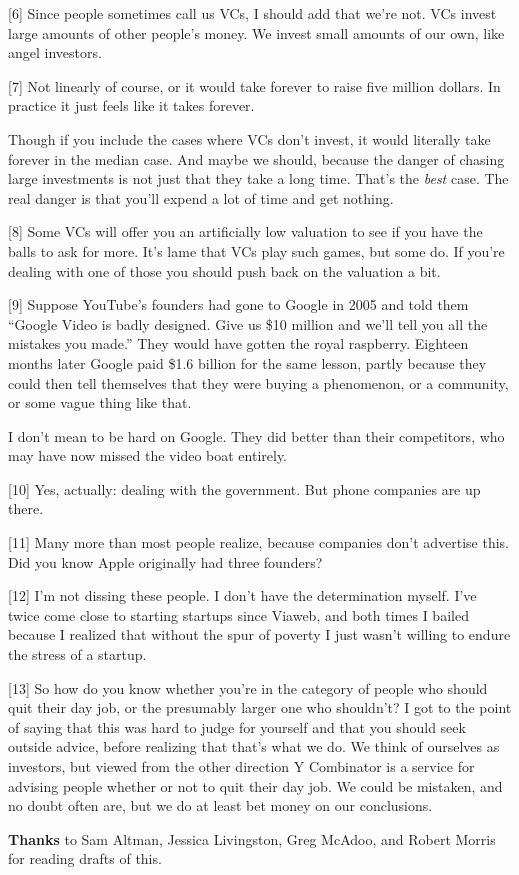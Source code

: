 {[}6{]} Since people sometimes call us VCs, I should add that we're not.
VCs invest large amounts of other people's money. We invest small
amounts of our own, like angel investors.

{[}7{]} Not linearly of course, or it would take forever to raise five
million dollars. In practice it just feels like it takes forever.

Though if you include the cases where VCs don't invest, it would
literally take forever in the median case. And maybe we should, because
the danger of chasing large investments is not just that they take a
long time. That's the \emph{best} case. The real danger is that you'll
expend a lot of time and get nothing.

{[}8{]} Some VCs will offer you an artificially low valuation to see if
you have the balls to ask for more. It's lame that VCs play such games,
but some do. If you're dealing with one of those you should push back on
the valuation a bit.

{[}9{]} Suppose YouTube's founders had gone to Google in 2005 and told
them ``Google Video is badly designed. Give us \$10 million and we'll
tell you all the mistakes you made.'' They would have gotten the royal
raspberry. Eighteen months later Google paid \$1.6 billion for the same
lesson, partly because they could then tell themselves that they were
buying a phenomenon, or a community, or some vague thing like that.

I don't mean to be hard on Google. They did better than their
competitors, who may have now missed the video boat entirely.

{[}10{]} Yes, actually: dealing with the government. But phone companies
are up there.

{[}11{]} Many more than most people realize, because companies don't
advertise this. Did you know Apple originally had three founders?

{[}12{]} I'm not dissing these people. I don't have the determination
myself. I've twice come close to starting startups since Viaweb, and
both times I bailed because I realized that without the spur of poverty
I just wasn't willing to endure the stress of a startup.

{[}13{]} So how do you know whether you're in the category of people who
should quit their day job, or the presumably larger one who shouldn't? I
got to the point of saying that this was hard to judge for yourself and
that you should seek outside advice, before realizing that that's what
we do. We think of ourselves as investors, but viewed from the other
direction Y Combinator is a service for advising people whether or not
to quit their day job. We could be mistaken, and no doubt often are, but
we do at least bet money on our conclusions.

\textbf{Thanks} to Sam Altman, Jessica Livingston, Greg McAdoo, and
Robert Morris for reading drafts of this.
